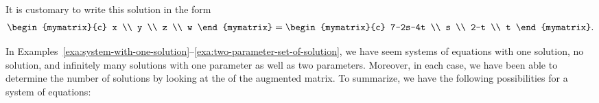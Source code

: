 \begin{solution}
  It is customary to write this solution in the form
  \begin{equation}\label{two-parameters-2}
    \begin{mymatrix}{c}
      x \\
      y \\
      z \\
      w
    \end{mymatrix} =\begin{mymatrix}{c}
      7-2s-4t \\
      s \\
      2-t \\
      t
    \end{mymatrix}.
  \end{equation}
\end{solution}

In
Examples~\ref{exa:system-with-one-solution}--\ref{exa:two-parameter-set-of-solution},
we have seem systems of equations with one solution, no solution, and
infinitely many solutions with one parameter as well as two
parameters. Moreover, in each case, we have been able to determine the
number of solutions by looking at the {\ef} of the augmented matrix.
To summarize, we have the following possibilities for a system of equations:

